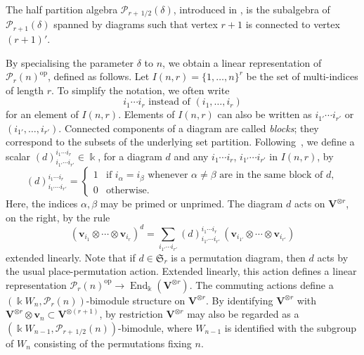 \documentclass[10pt]{article}
\theoremstyle{definition}
\DeclareMathOperator{\End}{End}
\DeclareMathOperator{\op}{op}
\newcommand{\Sym}{\mathfrak{S}}
\newcommand{\Ptn}{\mathcal{P}}
\newcommand{\V}{\mathbf{V}} %
\newcommand{\bv}{\mathbf{v}} %
\newcommand{\half}{\, 1/2} %
\begin{document}
The half partition algebra $\Ptn_{r+\half}(\delta)$, introduced in
\cite{Martin:2000}, is the subalgebra of $\Ptn_{r+1}(\delta)$ spanned
by diagrams such that vertex $r+1$ is connected to vertex $(r+1)'$.

By specialising the parameter $\delta$ to $n$, we obtain a linear
representation of $\Ptn_r(n)^{\op}$, defined as follows. Let $I(n,r) =
\{1, \dots, n\}^r$ be the set of multi-indices of length $r$. To
simplify the notation, we often write
\[
 \text{$i_1 \cdots i_r$ instead of $(i_1, \dots, i_r)$}
\]
for an element of $I(n,r)$. Elements of $I(n,r)$ can also be written
as $i_{1'} \cdots i_{r'}$ or $(i_{1'}, \dots, i_{r'})$. Connected
components of a diagram are called \emph{blocks}; they correspond to
the subsets of the underlying set partition. Following~\cite{HR-2005},
we define a scalar $(d)^{i_1 \cdots i_r}_{i_{1'} \cdots i_{r'}} \in
\Bbbk$, for a diagram $d$ and any $i_1 \cdots i_r$, $i_{1'} \cdots
i_{r'}$ in $I(n,r)$, by
\[
(d)^{i_1 \cdots i_r}_{i_{1'} \cdots i_{r'}} = 
\begin{cases}
 1 & \text{if } i_\alpha = i_\beta \text{ whenever } \alpha \ne
 \beta \text{ are in the same block of } d,\\ 
 0 & \text{otherwise}.
\end{cases}
\]
Here, the indices $\alpha,\beta$ may be primed or unprimed. The
diagram $d$ acts on $\V^{\otimes r}$, on the right, by the rule
\begin{equation}\label{eq:Ptn-action}
(\bv_{i_1} \otimes \cdots \otimes \bv_{i_r})^d = \sum_{i_{1'} \cdots
 i_{r'}} (d)^{i_1 \cdots i_r}_{i_{1'} \cdots i_{r'}} \, (\bv_{i_{1'}}
 \otimes \cdots \otimes \bv_{i_{r'}})
\end{equation}
extended linearly. Note that if $d \in \Sym_r$ is a permutation
diagram, then $d$ acts by the usual place-permutation action. Extended
linearly, this action defines a linear representation $\Ptn_r(n)^{\op}
\to \End_\Bbbk(\V^{\otimes r})$. The commuting actions define a
$(\Bbbk W_n, \Ptn_r(n))$-bimodule structure on $\V^{\otimes r}$. By
identifying $\V^{\otimes r}$ with $\V^{\otimes r} \otimes \bv_n
\subset \V^{\otimes (r+1)}$, by restriction $\V^{\otimes r}$ may also
be regarded as a $(\Bbbk W_{n-1}, \Ptn_{r+\half}(n))$-bimodule, where
$W_{n-1}$ is identified with the subgroup of $W_n$ consisting of the
permutations fixing $n$.
\end{document}
